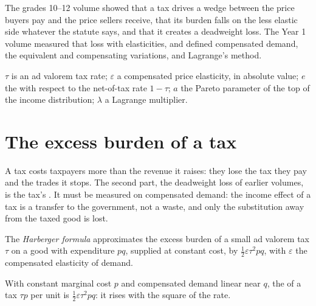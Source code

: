 \begin{recall}
The grades 10--12 volume showed that a tax drives a wedge between the price buyers
pay and the price sellers receive, that its burden falls on the less elastic side
whatever the statute says, and that it creates a deadweight loss. The Year 1 volume
measured that loss with elasticities, and defined compensated demand, the
equivalent and compensating variations, and Lagrange's method.
\end{recall}

\begin{notation}\label{not:b3:efficiency-cost-of-taxation:symbols}
$\tau$ is an ad valorem tax rate; $\varepsilon$ a compensated price elasticity, in absolute value;
$e$ the  with respect to the net-of-tax rate $1 - \tau$; $a$ the
Pareto parameter of the top of the income distribution; $\lambda$ a Lagrange multiplier.
\end{notation}

\section{The excess burden of a tax}\label{sec:b3:efficiency-cost-of-taxation:burden}

A tax costs taxpayers more than the revenue it raises: they lose the tax they pay
and the trades it stops. The second part, the deadweight loss of earlier volumes, is
the tax's \emph{}. It must be measured on compensated demand: the income
effect of a tax is a transfer to the government, not a waste, and only the
substitution away from the taxed good is lost.

\begin{definition}\label{def:b3:efficiency-cost-of-taxation:harberger}
The \emph{Harberger formula} approximates the excess burden of a small ad valorem tax
$\tau$ on a good with expenditure $pq$, supplied at constant cost, by $\tfrac12\varepsilon\tau^2 pq$, with $\varepsilon$ the
compensated elasticity of demand.
\end{definition}

\begin{proposition}\label{prop:b3:efficiency-cost-of-taxation:harberger}
With constant marginal cost $p$ and compensated demand linear near $q$, the  of a tax $\tau p$ per unit is $\tfrac12\varepsilon\tau^2 pq$: it rises with the square of the rate.
\end{proposition}

